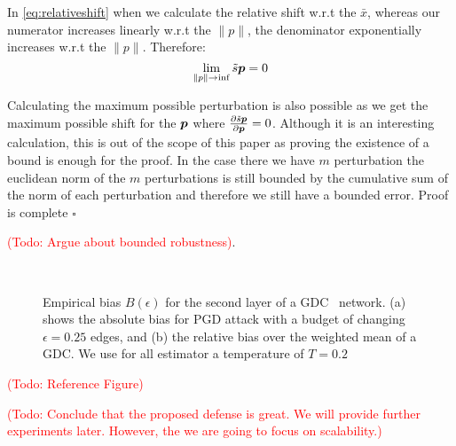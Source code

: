 \documentclass{article} %
\newenvironment{proof}{}{$\square$}
\newcommand{\todo}[1]{\textcolor{red}{(Todo: #1)}}
\begin{document}
\begin{proof}
    In \autoref{eq:relativeshift} when we calculate the relative shift w.r.t the $\bar{x}$, whereas our numerator increases linearly w.r.t the $\|p\|$, the denominator exponentially increases w.r.t the $\|p\|$. Therefore:
    \begin{equation}
        \lim_{\|p\| \to \inf} \tilde{s}{\bm{p}} = 0
    \end{equation}
    
    Calculating the maximum possible perturbation is also possible as we get the maximum possible shift for the ${\bm{p}}$ where $\frac{\partial \tilde{s}{\bm{p}}}{\partial {\bm{p}}} = 0$. Although it is an interesting calculation, this is out of the scope of this paper as proving the existence of a bound is enough for the proof. In the case there we have $m$ perturbation the euclidean norm of the $m$ perturbations is still bounded by the cumulative sum of the norm of each perturbation and therefore we still have a bounded error. Proof is complete
\fi
\end{proof}

\todo{Argue about bounded robustness}.

\begin{wrapfigure}[20]{r}{.5\textwidth}
  \centering
  \vspace{-28pt}
  \hbox{\hspace{15pt} \resizebox{0.9\linewidth}{!}{}}
  \vspace{-14pt}
  \caption{Empirical bias \(B(\epsilon)\) for the second layer of a GDC~\citep{Klicpera2019a} network. (a) shows the absolute bias for PGD attack with a budget of changing \(\epsilon=0.25\) edges, and (b) the relative bias over the weighted mean of a GDC. We use for all estimator a temperature of \(T=0.2\)\label{fig:empbiascurve}}
\end{wrapfigure}
\todo{Reference Figure}

\todo{Conclude that the proposed defense is great. We will provide further experiments later. However, the we are going to focus on scalability.}
\end{document}
